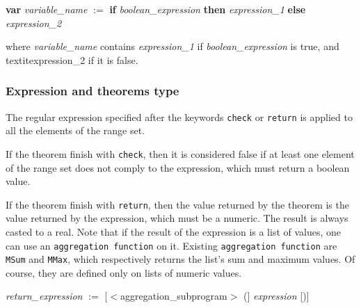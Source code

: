 \textbf{var} \textit{variable\_name} $:=$ \textbf{if} \textit{boolean\_expression} \textbf{then} \textit{expression\_1} \textbf{else} \textit{expression\_2}

where \textit{variable\_name} contains \textit{expression\_1} if \textit{boolean\_expression} is true, and textit{expression\_2} if it is false.

\subsubsection {Expression and theorems type}

The regular expression specified after the keywords \texttt{check} 
or \texttt{return} is applied to all the elements of the range set.

If the theorem finish with \texttt{check}, then it is considered 
false if at least one element of the range set does not comply to 
the expression, which must return a boolean value.

If the theorem finish with \texttt{return}, then the value 
returned by the theorem is the value returned by the expression,
which must be a numeric. The result is always casted to a real. Note
that if the result of the expression is a list of values, one can use
an \texttt{aggregation function} on it. Existing \texttt{aggregation 
function} are \texttt{MSum} and \texttt{MMax}, which respectively 
returns the list's sum and maximum values. Of course, they are defined 
only on lists of numeric values.

\textit{return\_expression} $:=$ [$<$aggregation\_subprogram$>$ (]  \textit{expression} [)]
